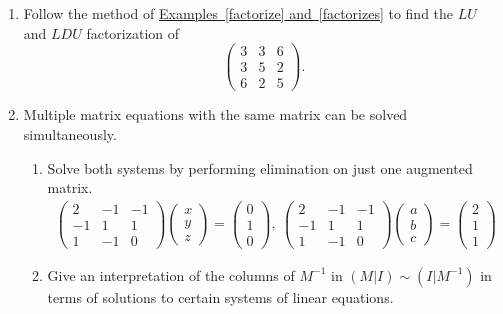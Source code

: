 \begin{enumerate}

\item Follow the method of  \hyperlink{elldeeeww}{Examples~\ref*{factorize} and~\ref*{factorizes}} to find the $LU$ and $LDU$ factorization of 
\[
\begin{pmatrix}
3	&3 	&6 \\ %
3 	&5 	&2 \\ %
6	&2	&5 %
\end{pmatrix} .
\]




\item 
Multiple matrix equations with the same matrix can be solved simultaneously. 
\begin{enumerate}
\item Solve both systems by performing elimination on just one augmented matrix.
\begin{align*}
\begin{pmatrix}
2	&-1 	&-1 \\ %
-1 	&1 	&1 \\ %
1	&-1	&0  %
\end{pmatrix} 
\begin{pmatrix}
 x \\ 
y \\
z 
\end{pmatrix} 
=
\begin{pmatrix}
0\\ 
1  \\
0  
\end{pmatrix} 
,~
\begin{pmatrix}
2	&-1 	&-1 \\ %
-1 	&1 	&1 \\ %
1	&-1	&0 %
\end{pmatrix} 
\begin{pmatrix}
 a \\ 
b \\
c 
\end{pmatrix} 
=
\begin{pmatrix}
2\\ 
1  \\
1 
\end{pmatrix} 
\end{align*}
\item Give an interpretation of the columns of $M^{-1}$ in $(M|I)\sim (I|M^{-1})$ in terms of solutions to certain systems of linear equations.
\end{enumerate}


\end{enumerate}
